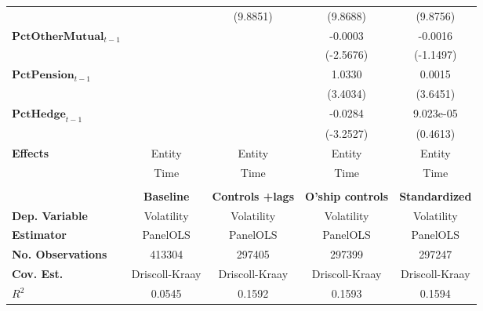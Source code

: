{\begin{longtable}{>{\bfseries}lcccc}
                 &                    &            (9.8851)           &            (9.8688)            &        (9.8756)        \\
$\mathbf{PctOtherMutual}_{t-1}$    &                    &                               &            -0.0003             &        -0.0016         \\
                       &                    &                               &           (-2.5676)            &       (-1.1497)        \\
$\mathbf{PctPension}_{t-1}$        &                    &                               &             1.0330             &         0.0015         \\
                               &                    &                               &            (3.4034)            &        (3.6451)        \\
$\mathbf{PctHedge}_{t-1}$          &                    &                               &            -0.0284             &       9.023e-05        \\
                           &                    &                               &           (-3.2527)            &        (0.4613)        \\
\midrule
Effects                           &       Entity       &             Entity            &             Entity             &         Entity         \\
& Time &  Time  &  Time &  Time\\
\bottomrule
\bigskip\\
\toprule
& \textbf{Baseline}  & \textbf{Controls +lags} & \textbf{O'ship controls} & \textbf{Standardized}  \\
\midrule
Dep. Variable                     &     Volatility     &           Volatility          &           Volatility           &       Volatility       \\
Estimator                         &      PanelOLS      &            PanelOLS           &            PanelOLS            &        PanelOLS        \\
No. Observations                  &       413304       &             297405            &             297399             &         297247         \\
Cov. Est.                         &   Driscoll-Kraay   &         Driscoll-Kraay        &         Driscoll-Kraay         &     Driscoll-Kraay     \\
$R^{2}$                         &       0.0545       &             0.1592            &             0.1593             &         0.1594         \\

\end{longtable}}
